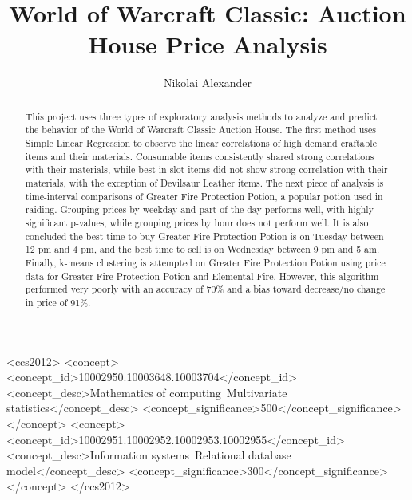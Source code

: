 \documentclass[sigconf]{acmart}
\begin{document}
%
\title{World of Warcraft Classic: Auction House Price Analysis}

%
\author{Nikolai Alexander}

%
\renewcommand{\shortauthors}{Alexander}

%
\begin{abstract}
This project uses three types of exploratory analysis methods to analyze and predict the behavior of the World of Warcraft Classic Auction House. The first method uses Simple Linear Regression to observe the linear correlations of high demand craftable items and their materials. Consumable items consistently shared strong correlations with their materials, while best in slot items did not show strong correlation with their materials, with the exception of Devilsaur Leather items. The next piece of analysis is time-interval comparisons of Greater Fire Protection Potion, a popular potion used in raiding. Grouping prices by weekday and part of the day performs well, with highly significant p-values, while grouping prices by hour does not perform well. It is also concluded the best time to buy Greater Fire Protection Potion is on Tuesday between 12 pm and 4 pm, and the best time to sell is on Wednesday between 9 pm and 5 am. Finally, k-means clustering is attempted on Greater Fire Protection Potion using price data for Greater Fire Protection Potion and Elemental Fire. However, this algorithm performed very poorly with an accuracy of 70\% and a bias toward decrease/no change in price of 91\%.
\end{abstract}

%
%
\begin{CCSXML}
<ccs2012>
<concept>
<concept_id>10002950.10003648.10003704</concept_id>
<concept_desc>Mathematics of computing~Multivariate statistics</concept_desc>
<concept_significance>500</concept_significance>
</concept>
<concept>
<concept_id>10002951.10002952.10002953.10002955</concept_id>
<concept_desc>Information systems~Relational database model</concept_desc>
<concept_significance>300</concept_significance>
</concept>
</ccs2012>
\end{CCSXML}
\end{document}
